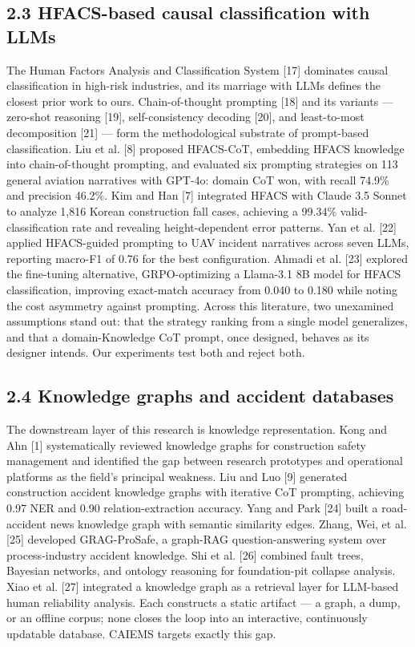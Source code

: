 \documentclass[11pt]{article}
\begin{document}
\subsection{2.3 HFACS-based causal classification with LLMs}
The Human Factors Analysis and Classification System [17] dominates causal classification in high-risk industries, and its marriage with LLMs defines the closest prior work to ours. Chain-of-thought prompting [18] and its variants --- zero-shot reasoning [19], self-consistency decoding [20], and least-to-most decomposition [21] --- form the methodological substrate of prompt-based classification. Liu et al. [8] proposed HFACS-CoT, embedding HFACS knowledge into chain-of-thought prompting, and evaluated six prompting strategies on 113 general aviation narratives with GPT-4o: domain CoT won, with recall 74.9\% and precision 46.2\%. Kim and Han [7] integrated HFACS with Claude 3.5 Sonnet to analyze 1,816 Korean construction fall cases, achieving a 99.34\% valid-classification rate and revealing height-dependent error patterns. Yan et al. [22] applied HFACS-guided prompting to UAV incident narratives across seven LLMs, reporting macro-F1 of 0.76 for the best configuration. Ahmadi et al. [23] explored the fine-tuning alternative, GRPO-optimizing a Llama-3.1 8B model for HFACS classification, improving exact-match accuracy from 0.040 to 0.180 while noting the cost asymmetry against prompting. Across this literature, two unexamined assumptions stand out: that the strategy ranking from a single model generalizes, and that a domain-Knowledge CoT prompt, once designed, behaves as its designer intends. Our experiments test both and reject both.

\subsection{2.4 Knowledge graphs and accident databases}
The downstream layer of this research is knowledge representation. Kong and Ahn [1] systematically reviewed knowledge graphs for construction safety management and identified the gap between research prototypes and operational platforms as the field's principal weakness. Liu and Luo [9] generated construction accident knowledge graphs with iterative CoT prompting, achieving 0.97 NER and 0.90 relation-extraction accuracy. Yang and Park [24] built a road-accident news knowledge graph with semantic similarity edges. Zhang, Wei, et al. [25] developed GRAG-ProSafe, a graph-RAG question-answering system over process-industry accident knowledge. Shi et al. [26] combined fault trees, Bayesian networks, and ontology reasoning for foundation-pit collapse analysis. Xiao et al. [27] integrated a knowledge graph as a retrieval layer for LLM-based human reliability analysis. Each constructs a static artifact --- a graph, a dump, or an offline corpus; none closes the loop into an interactive, continuously updatable database. CAIEMS targets exactly this gap.
\end{document}
